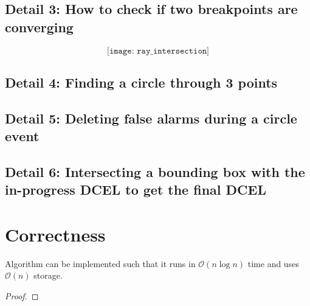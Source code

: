 \subsection*{Detail 3: How to check if two breakpoints are converging}
\[
    \texttt{[image: ray\_intersection]}
\]

\subsection*{Detail 4: Finding a circle through 3 points}
\subsection*{Detail 5: Deleting false alarms during a circle event}
\subsection*{Detail 6: Intersecting a bounding box with the in-progress DCEL to get the final DCEL}

\section{Correctness}
\begin{lem}
Algorithm \label{alg:fortune} can be implemented such that it runs in $\mathcal{O}(n \log n)$ time and uses $\mathcal{O}(n)$ storage.
\end{lem}
\begin{proof}
\end{proof}
